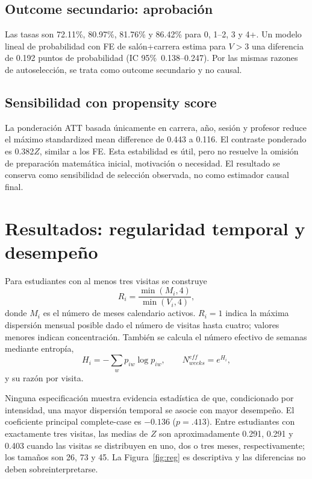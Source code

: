 \documentclass[11pt,letterpaper]{article}
\newcommand{\CI}{IC 95\%}
\begin{document}
\subsection{Outcome secundario: aprobación}

\begin{table}[H]
\centering
\caption{Proporción de aprobación por grupo de utilización}

\end{table}

Las tasas son 72.11\%, 80.97\%, 81.76\% y 86.42\% para 0, 1--2, 3 y 4+. Un modelo lineal de probabilidad con FE de salón+carrera estima para $V>3$ una diferencia de 0.192 puntos de probabilidad (\CI\ 0.138--0.247). Por las mismas razones de autoselección, se trata como outcome secundario y no causal.

\subsection{Sensibilidad con propensity score}

La ponderación ATT basada únicamente en carrera, año, sesión y profesor reduce el máximo standardized mean difference de 0.443 a 0.116. El contraste ponderado es 0.382$Z$, similar a los FE. Esta estabilidad es útil, pero no resuelve la omisión de preparación matemática inicial, motivación o necesidad. El resultado se conserva como sensibilidad de selección observada, no como estimador causal final.

\section{Resultados: regularidad temporal y desempeño}

Para estudiantes con al menos tres visitas se construye
\[
R_i=\frac{\min(M_i,4)}{\min(V_i,4)},
\]
donde $M_i$ es el número de meses calendario activos. $R_i=1$ indica la máxima dispersión mensual posible dado el número de visitas hasta cuatro; valores menores indican concentración. También se calcula el número efectivo de semanas mediante entropía,
\[
H_i=-\sum_wp_{iw}\log p_{iw},\qquad N^{eff}_{weeks}=e^{H_i},
\]
y su razón por visita.

\begin{table}[H]
\centering
\caption{Modelos de regularidad temporal y desempeño}

\end{table}

Ninguna especificación muestra evidencia estadística de que, condicionado por intensidad, una mayor dispersión temporal se asocie con mayor desempeño. El coeficiente principal complete-case es $-0.136$ ($p=.413$). Entre estudiantes con exactamente tres visitas, las medias de $Z$ son aproximadamente 0.291, 0.291 y 0.403 cuando las visitas se distribuyen en uno, dos o tres meses, respectivamente; los tamaños son 26, 73 y 45. La Figura~\ref{fig:reg} es descriptiva y las diferencias no deben sobreinterpretarse.
\end{document}
